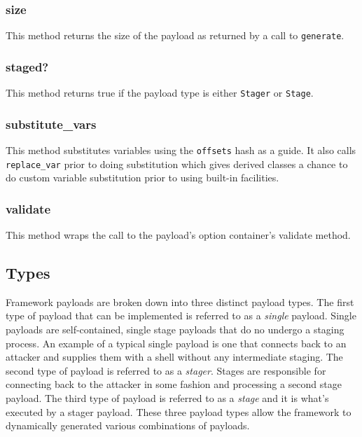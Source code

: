 \documentclass{report}
\begin{document}
            \subsubsection{size}

\par
This method returns the size of the payload as returned by a call to
\texttt{generate}.

            \subsubsection{staged?}

\par
This method returns true if the payload type is either
\texttt{Stager} or \texttt{Stage}.

            \subsubsection{substitute\_vars}

\par
This method substitutes variables using the \texttt{offsets} hash as
a guide.  It also calls \texttt{replace\_var} prior to doing
substitution which gives derived classes a chance to do custom
variable substitution prior to using built-in facilities.

            \subsubsection{validate}

\par
This method wraps the call to the payload's option container's
validate method.

        \subsection{Types}

\par
Framework payloads are broken down into three distinct payload
types.  The first type of payload that can be implemented is
referred to as a \textit{single} payload.  Single payloads are
self-contained, single stage payloads that do no undergo a staging
process.  An example of a typical single payload is one that
connects back to an attacker and supplies them with a shell without
any intermediate staging.  The second type of payload is referred to
as a \textit{stager}.  Stages are responsible for connecting back to
the attacker in some fashion and processing a second stage payload.
The third type of payload is referred to as a \textit{stage} and it
is what's executed by a stager payload.  These three payload types
allow the framework to dynamically generated various combinations of
payloads.
\end{document}

